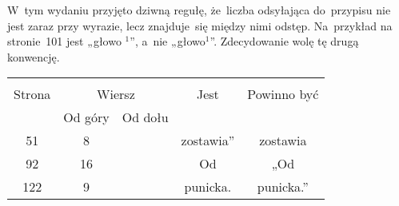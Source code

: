 \documentclass[a4paper,11pt]{article}
\begin{document}
\vspace{\spaceTwo}














\start W~tym wydaniu przyjęto dziwną regułę, że~liczba odsyłająca
do~przypisu nie jest zaraz przy wyrazie,
lecz znajduje~się między nimi odstęp. Na~przykład na stronie~101 jest
„głowo $^{ 1 }$”, a~nie „głowo$^{ 1 }$”. Zdecydowanie wolę tę drugą
konwencję.

\vspace{\spaceTwo}










\newpage
{}






\begin{center}

  \begin{tabular}{|c|c|c|c|c|}
    \hline
    & \multicolumn{2}{c|}{} & & \\
    Strona & \multicolumn{2}{c|}{Wiersz} & Jest
                              & Powinno być \\ \cline{2-3}
    & Od góry & Od dołu & & \\
    \hline
    51  &  8 & & zostawia” & zostawia \\
    92  & 16 & & Od & „Od \\
    122 &  9 & & punicka. & punicka.” \\
    \hline
  \end{tabular}

\end{center}
\end{document}
